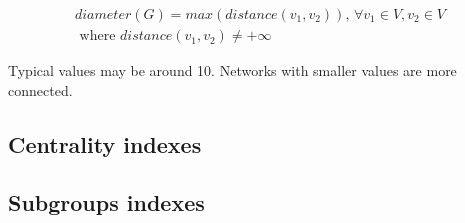 \begin{itemize}
\begin{equation}
\begin{split}
diameter(G) = max\left ( distance(v_{1}, v_{2}) \right )
\textrm {, } \forall v_{1} \in V, v_{2} \in V \\
\textrm{ where }
distance(v_{1}, v_{2}) \neq  +\infty
\end{split}
\label{eq:diameter}
\end{equation}

Typical values may be around 10. Networks with smaller values are more connected.

\end{itemize}

\subsection{Centrality indexes}

\subsection{Subgroups indexes}
